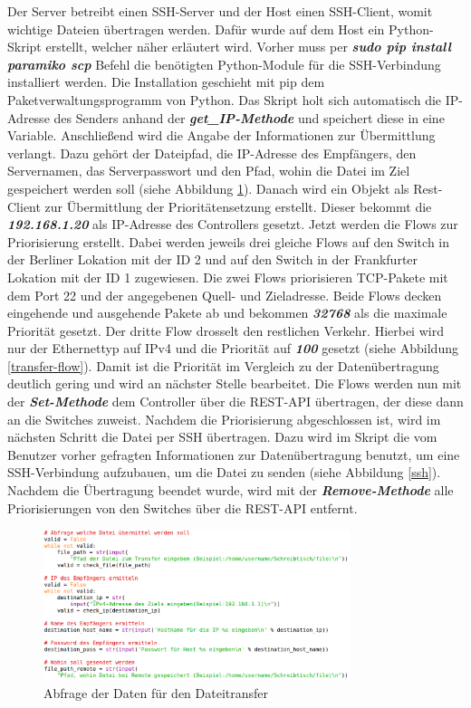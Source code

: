 \documentclass[fontsize=12pt,paper=a4,open=any,parskip=half,
  twoside=false,toc=listof,toc=bibliography,fleqn,leqno,
  captions=nooneline,captions=tableabove,british]{scrbook}
\begin{document}
Der Server betreibt einen SSH-Server und der Host einen SSH-Client, womit wichtige Dateien übertragen werden. Dafür wurde auf dem Host ein Python-Skript erstellt, welcher näher erläutert wird. Vorher muss per \textit{\textbf{sudo pip install paramiko scp}} Befehl die benötigten Python-Module für die SSH-Verbindung installiert werden. Die Installation geschieht mit pip dem Paketverwaltungsprogramm von Python. Das Skript holt sich automatisch die IP-Adresse des Senders anhand der \textit{\textbf{get\_IP-Methode}} und speichert diese in eine Variable. Anschließend wird die Angabe der Informationen zur Übermittlung verlangt. Dazu gehört der Dateipfad, die IP-Adresse des Empfängers, den Servernamen, das Serverpasswort und den Pfad, wohin die Datei im Ziel gespeichert werden soll (siehe Abbildung \ref{transfer-daten}). Danach wird ein Objekt als Rest-Client zur Übermittlung der Prioritätensetzung erstellt. Dieser bekommt die \textit{\textbf{192.168.1.20}} als IP-Adresse des Controllers gesetzt. Jetzt werden die Flows zur Priorisierung erstellt. Dabei werden jeweils drei gleiche Flows auf den Switch in der Berliner Lokation mit der ID 2 und auf den Switch in der Frankfurter Lokation mit der ID 1 zugewiesen. Die zwei Flows priorisieren TCP-Pakete mit dem Port 22 und der angegebenen Quell- und Zieladresse. Beide Flows decken eingehende und ausgehende Pakete ab und bekommen \textit{\textbf{32768}} als die maximale Priorität gesetzt. Der dritte Flow drosselt den restlichen Verkehr. Hierbei wird nur der Ethernettyp auf IPv4 und die Priorität auf \textit{\textbf{100}} gesetzt (siehe Abbildung \ref{transfer-flow}). Damit ist die Priorität im Vergleich zu der Datenübertragung deutlich gering und wird an nächster Stelle bearbeitet. Die Flows werden nun mit der \textit{\textbf{Set-Methode}} dem Controller über die REST-API übertragen, der diese dann an die Switches zuweist. Nachdem die Priorisierung abgeschlossen ist, wird im nächsten Schritt die Datei per SSH übertragen. Dazu wird im Skript die vom Benutzer vorher gefragten Informationen zur Datenübertragung benutzt, um eine SSH-Verbindung aufzubauen, um die Datei zu senden (siehe Abbildung \ref{ssh}). Nachdem die Übertragung beendet wurde, wird mit der \textit{\textbf{Remove-Methode}} alle Priorisierungen von den Switches über die REST-API entfernt.

\begin{figure}[H]
 \centering
 \includegraphics[width=0.8\textwidth]{Bilder/transfer-daten}
 \captionsetup{justification=centering}
 \caption{Abfrage der Daten für den Dateitransfer}
 \label{transfer-daten}
\end{figure}
\end{document}

